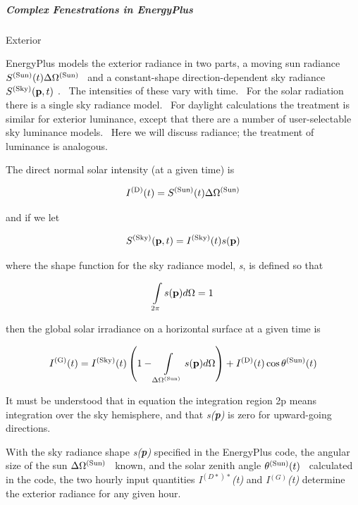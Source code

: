 \subparagraph{Complex Fenestrations in EnergyPlus}\label{complex-fenestrations-in-energyplus}

Exterior

EnergyPlus models the exterior radiance in two parts, a moving sun radiance \({S^{{\rm{(Sun)}}}}(t)\Delta {\Omega ^{{\rm{(Sun)}}}}\) ~and a constant-shape direction-dependent sky radiance \({S^{{\rm{(Sky)}}}}({\bf{p}},t)\) .~ The intensities of these vary with time.~ For the solar radiation there is a single sky radiance model.~ For daylight calculations the treatment is similar for exterior luminance, except that there are a number of user-selectable sky luminance models.~ Here we will discuss radiance; the treatment of luminance is analogous.

The direct normal solar intensity (at a given time) is

\begin{equation}
{I^{{\rm{(D)}}}}(t) = {S^{{\rm{(Sun)}}}}(t)\Delta {\Omega ^{{\rm{(Sun)}}}}
\end{equation}

and if we let

\begin{equation}
{S^{{\rm{(Sky)}}}}({\bf{p}},t) = {I^{{\rm{(Sky)}}}}(t)s({\bf{p}})
\end{equation}

where the shape function for the sky radiance model, \emph{s}, is defined so that

\begin{equation}
\int\limits_{2\pi } {s({\bf{p}})d\Omega }  = 1
\end{equation}

then the global solar irradiance on a horizontal surface at a given time is

\begin{equation}
{I^{{\rm{(G)}}}}(t) = {I^{{\rm{(Sky)}}}}(t)\left( {1 - \int\limits_{\Delta {\Omega ^{{\rm{(Sun)}}}}} {s({\bf{p}})d\Omega } } \right) + {I^{{\rm{(D)}}}}(t)\cos {\theta ^{{\rm{(Sun)}}}}(t)
\end{equation}

It must be understood that in equation the integration region 2p means integration over the sky hemisphere, and that \emph{s(\textbf{p})} is zero for upward-going directions.

With the sky radiance shape \emph{s(\textbf{p})} specified in the EnergyPlus code, the angular size of the sun \(\Delta {\Omega ^{{\rm{(Sun)}}}}\) ~known, and the solar zenith angle \({\theta ^{{\rm{(Sun)}}}}(t)\) ~calculated in the code, the two hourly input quantities \emph{I}\(^{(D*)*}\)\emph{(t)} and \emph{I}\(^{(G)}\)\emph{(t)} determine the exterior radiance for any given hour.

